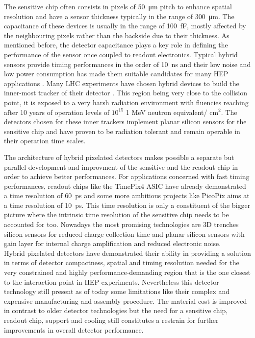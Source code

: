 		 The sensitive chip often consists in pixels of \SI{50}{\micro\meter} pitch to enhance spatial resolution and have a sensor thickness typically in the range of \SI{300}{\micro\meter}. The capacitance of these devices is usually in the range of \SI{100}{\femto\farad}, mostly affected by the neighbouring pixels rather than the backside due to their thickness. As mentioned before, the detector capacitance plays a key role in defining the performance of the sensor once coupled to readout electronics. Typical hybrid sensors provide timing performances in the order of \SI{10}{\nano\second} and their low noise and low power consumption has made them suitable candidates for many HEP applications \cite{Picardi_thesis}. 
		 Many LHC experiments have chosen hybrid devices to build the inner-most tracker of their detector \cite{pixel_vertex_detector}. This region being very close to the collision point, it is exposed to a very harsh radiation environment with fluencies reaching after 10 years of operation levels of $10^{15} $ 1 MeV neutron equivalent/ cm$^2$. The detectors chosen for these inner trackers implement planar silicon sensors for the sensitive chip and have proven to be radiation tolerant and remain operable in their operation time scales. 
		 
		 The architecture of hybrid pixelated detectors makes possible a separate but parallel development and improvment of the sensitive and the readout chip in order to achieve better performances. For applications concerned with fast timing performances, readout chips like the TimePix4 \cite{timepix4} ASIC have already demonstrated a time resolution of \SI{60}{\pico\second} and some more ambitious projects like PicoPix \cite{picoPix} aims at a time resolution of \SI{10}{\pico\second}. This time resolution is only a constituent of the bigger picture where the intrinsic time resolution of the sensitive chip needs to be accounted for too. Nowadays the most promising technologies are 3D trenches silicon sensors for reduced charge collection time and planar silicon sensors with gain layer for internal charge amplification and reduced electronic noise.  \\
		 
		 Hybrid pixelated detectors have demonstrated their ability in providing a solution in terms of detector compactness, spatial and timing resolution needed for the very constrained and highly performance-demanding region that is the one closest to the interaction point in HEP experiments. Nevertheless this detector technology still present as of today some limitations like their complex and expensive manufacturing and assembly procedure. The material cost is improved in contrast to older detector technologies but the need for a sensitive chip, readout chip, support and cooling still constitutes a restrain for further improvements in overall detector performance. 
		  
